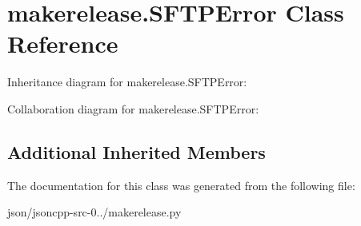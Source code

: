 \hypertarget{classmakerelease_1_1_s_f_t_p_error}{\section{makerelease.\+S\+F\+T\+P\+Error Class Reference}
\label{classmakerelease_1_1_s_f_t_p_error}
}


Inheritance diagram for makerelease.\+S\+F\+T\+P\+Error\+:


Collaboration diagram for makerelease.\+S\+F\+T\+P\+Error\+:
\subsection*{Additional Inherited Members}


The documentation for this class was generated from the following file\+:\begin{DoxyCompactItemize}
\item 
json/jsoncpp-\/src-\/0../makerelease.\+py\end{DoxyCompactItemize}
